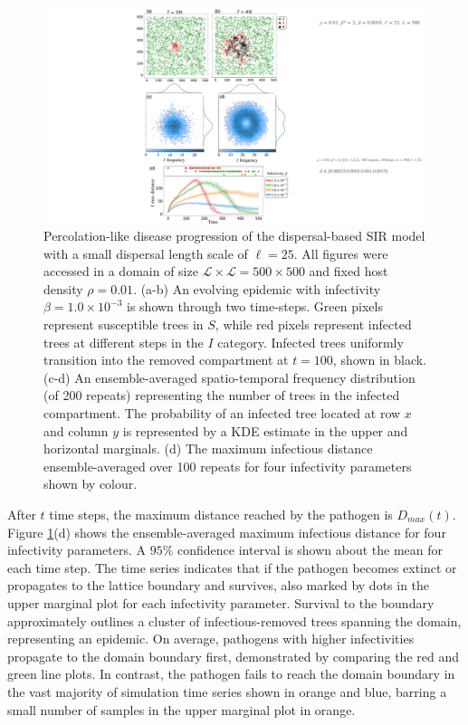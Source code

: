 \begin{figure}
    \centering
    \includegraphics[scale=0.48]{chapter5/figures/fig1-sir-spatio-temporal.pdf}
    \caption{Percolation-like disease progression of the dispersal-based SIR model with a small dispersal length scale of $\ell = 25$. 
    All figures were accessed in a domain of size $\mathcal{L} \times \mathcal{L} = 500 \times 500$ and fixed host density $\rho=0.01$. (a-b) An evolving epidemic with infectivity $\beta=1.0\times 10^{-3}$ is shown through two time-steps. Green pixels represent susceptible trees in $S$, while red pixels represent infected trees at different steps in the $I$ category. Infected trees uniformly transition into the removed compartment at $t=100$, shown in black. (c-d) An ensemble-averaged spatio-temporal frequency distribution (of 200 repeats) representing the number of trees in the infected compartment. The probability of an infected tree located at row $x$ and column $y$ is represented by a KDE estimate in the upper and horizontal marginals. (d) The maximum infectious distance ensemble-averaged over 100 repeats for four infectivity parameters shown by colour.}
\label{fig:sgm-evol}
\end{figure}

After $t$ time steps, the maximum distance reached by the pathogen is $D_{max}(t)$.
Figure \ref{fig:sgm-evol}(d) shows the ensemble-averaged maximum infectious distance for four infectivity parameters.
A $95\%$ confidence interval is shown about the mean for each time step. 
The time series indicates that if the pathogen becomes extinct or propagates to the lattice boundary and survives, also marked by dots in the upper marginal plot for each infectivity parameter.
Survival to the boundary approximately outlines a cluster of infectious-removed trees spanning the domain, representing an epidemic.
On average, pathogens with higher infectivities propagate to the domain boundary first, demonstrated by comparing the red and green line plots.
In contrast, the pathogen fails to reach the domain boundary in the vast majority of simulation time series shown in orange and blue, barring a small number of samples in the upper marginal plot in orange.

